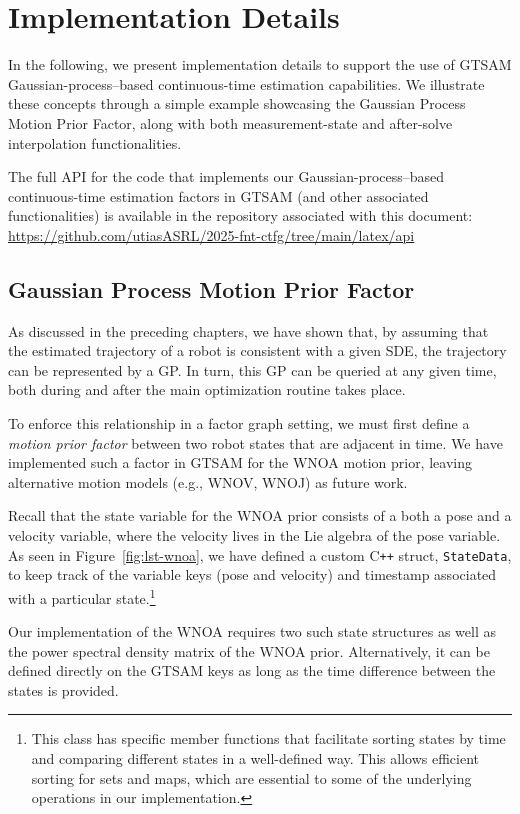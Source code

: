 \section{Implementation Details}
\label{sec:imp}
In the following, we present implementation details to support the use of \ac{GTSAM} Gaussian-process–based continuous-time estimation capabilities. We illustrate these concepts through a simple example showcasing the Gaussian Process Motion Prior Factor, along with both measurement-state and after-solve interpolation functionalities.

The full \ac{API} for the code that implements our Gaussian-process–based continuous-time estimation factors in \ac{GTSAM} (and other associated functionalities) is available in the repository associated with this document: \url{https://github.com/utiasASRL/2025-fnt-ctfg/tree/main/latex/api}

\subsection{Gaussian Process Motion Prior Factor}

As discussed in the preceding chapters, we have shown that, by assuming that the estimated trajectory of a robot is consistent with a given \ac{SDE}, the trajectory can be represented by a \ac{GP}.
In turn, this \ac{GP} can be queried at any given time, both during and after the main optimization routine takes place.

To enforce this relationship in a factor graph setting, we must first define a \emph{motion prior factor} between two robot states that are adjacent in time.
We have implemented such a factor in \ac{GTSAM} for the \ac{WNOA} motion prior, leaving alternative motion models (e.g., \ac{WNOV}, \ac{WNOJ}) as future work. 
 
Recall that the state variable for the \ac{WNOA} prior consists of a both a pose and a velocity variable, where the velocity lives in the Lie algebra of the pose variable.
As seen in Figure~\ref{fig:lst-wnoa}, we have defined a custom C\texttt{++} struct, \texttt{StateData}, to keep track of the variable keys (pose and velocity) and timestamp associated with a particular state.\footnote{This class has specific member functions that facilitate sorting states by time and comparing different states in a well-defined way. This allows efficient sorting for sets and maps, which are essential to some of the underlying operations in our implementation.}

Our implementation of the \ac{WNOA} requires two such state structures as well as the power spectral density matrix of the \ac{WNOA} prior. Alternatively, it can be defined directly on the \ac{GTSAM} keys as long as the time difference between the states is provided.

